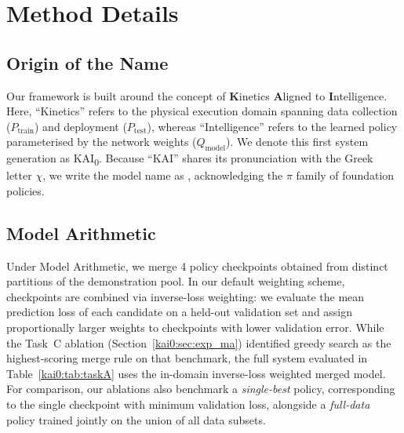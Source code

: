 \section{Method Details}\label{kai0:app:method}

\subsection{Origin of the Name}\label{kai0:app:name}
Our framework is built around the concept of \textbf{K}inetics \textbf{A}ligned to \textbf{I}ntelligence. Here, ``Kinetics'' refers to the physical execution domain spanning data collection ($P_{\mathrm{train}}$) and deployment ($P_{\mathrm{test}}$), whereas ``Intelligence'' refers to the learned policy parameterised by the network weights ($Q_{\mathrm{model}}$). We denote this first system generation as KAI\textsubscript{0}. Because ``KAI'' shares its pronunciation with the Greek letter $\chi$, we write the model name as \chiz, acknowledging the $\pi$ family of foundation policies.

\subsection{Model Arithmetic}\label{kai0:app:ma}
Under Model Arithmetic, we merge 4 policy checkpoints obtained from distinct partitions of the demonstration pool. In our default weighting scheme, checkpoints are combined via inverse-loss weighting: we evaluate the mean prediction loss of each candidate on a held-out validation set and assign proportionally larger weights to checkpoints with lower validation error. While the Task~C ablation (Section~\ref{kai0:sec:exp_ma}) identified greedy search as the highest-scoring merge rule on that benchmark, the full system evaluated in Table~\ref{kai0:tab:taskA} uses the in-domain inverse-loss weighted merged model. For comparison, our ablations also benchmark a \emph{single-best} policy, corresponding to the single checkpoint with minimum validation loss, alongside a \emph{full-data} policy trained jointly on the union of all data subsets.

